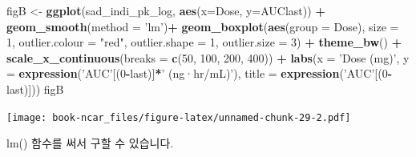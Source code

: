 \documentclass[12pt,]{krantz}
\newenvironment{Shaded}{\begin{snugshade}}{\end{snugshade}}
\newcommand{\KeywordTok}[1]{\textcolor[rgb]{0.13,0.29,0.53}{\textbf{#1}}}
\newcommand{\DataTypeTok}[1]{\textcolor[rgb]{0.13,0.29,0.53}{#1}}
\newcommand{\DecValTok}[1]{\textcolor[rgb]{0.00,0.00,0.81}{#1}}
\newcommand{\StringTok}[1]{\textcolor[rgb]{0.31,0.60,0.02}{#1}}
\newcommand{\OperatorTok}[1]{\textcolor[rgb]{0.81,0.36,0.00}{\textbf{#1}}}
\newcommand{\NormalTok}[1]{#1}
\theoremstyle{definition}
\theoremstyle{definition}
\theoremstyle{definition}
\theoremstyle{remark}
\begin{document}
\begin{Shaded}
\begin{Highlighting}[]
\NormalTok{figB <-}\StringTok{ }\KeywordTok{ggplot}\NormalTok{(sad_indi_pk_log, }\KeywordTok{aes}\NormalTok{(}\DataTypeTok{x=}\NormalTok{Dose, }\DataTypeTok{y=}\NormalTok{AUClast)) }\OperatorTok{+}
\StringTok{  }\KeywordTok{geom_smooth}\NormalTok{(}\DataTypeTok{method =} \StringTok{'lm'}\NormalTok{)}\OperatorTok{+}
\StringTok{  }\KeywordTok{geom_boxplot}\NormalTok{(}\KeywordTok{aes}\NormalTok{(}\DataTypeTok{group =}\NormalTok{ Dose), }
               \DataTypeTok{size =} \DecValTok{1}\NormalTok{, }
               \DataTypeTok{outlier.colour =} \StringTok{"red"}\NormalTok{, }
               \DataTypeTok{outlier.shape =} \DecValTok{1}\NormalTok{, }
               \DataTypeTok{outlier.size =} \DecValTok{3}\NormalTok{) }\OperatorTok{+}
\StringTok{  }\KeywordTok{theme_bw}\NormalTok{() }\OperatorTok{+}
\StringTok{  }\KeywordTok{scale_x_continuous}\NormalTok{(}\DataTypeTok{breaks =} \KeywordTok{c}\NormalTok{(}\DecValTok{50}\NormalTok{, }\DecValTok{100}\NormalTok{, }\DecValTok{200}\NormalTok{, }\DecValTok{400}\NormalTok{)) }\OperatorTok{+}
\StringTok{  }\KeywordTok{labs}\NormalTok{(}\DataTypeTok{x =} \StringTok{'Dose (mg)'}\NormalTok{, }\DataTypeTok{y =} \KeywordTok{expression}\NormalTok{(}\StringTok{'AUC'}\NormalTok{[(}\DecValTok{0}\OperatorTok{-}\NormalTok{last)]}\OperatorTok{*}\StringTok{' (ng·hr/mL)'}\NormalTok{),}
       \DataTypeTok{title =} \KeywordTok{expression}\NormalTok{(}\StringTok{'AUC'}\NormalTok{[(}\DecValTok{0}\OperatorTok{-}\NormalTok{last)]))}
\NormalTok{figB}
\end{Highlighting}
\end{Shaded}

\texttt{[image: book-ncar\_files/figure-latex/unnamed-chunk-29-2.pdf]}

lm() 함수를 써서 구할 수 있습니다.
\end{document}

